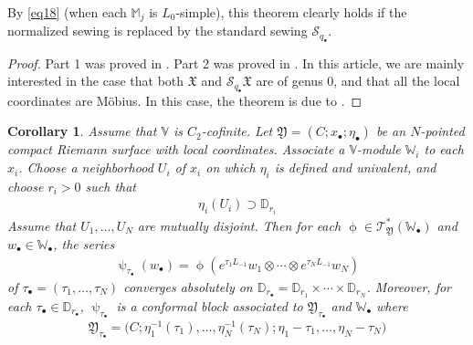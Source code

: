 \documentclass[11pt,b5paper,notitlepage]{article}
\theoremstyle{definition}
\theoremstyle{plain}
\newtheorem{co}[df]{Corollary}
\newcommand{\fk}{\mathfrak}
\newcommand{\mc}{\mathcal}
\newcommand{\scr}{\mathscr}
\newcommand{\blt}{\bullet}
\newcommand{\Vbb}{\mathbb V}
\newcommand{\Wbb}{\mathbb W}
\newcommand{\Mbb}{\mathbb M}
\newcommand{\Dbb}{\mathbb D}
\numberwithin{equation}{section}
\begin{document}
By \eqref{eq18} (when each $\Mbb_j$ is $L_0$-simple), this theorem clearly holds if the normalized sewing is replaced by the standard sewing $\mc S_{q_\blt}$.

\begin{proof}
Part 1 was proved in \cite[Thm. 11.3-1]{Gui23a}. Part 2 was proved in \cite[Thm. 11.4 or 13.1]{Gui23a}. In this article, we are mainly interested in the case that both $\fk X$ and $\mc S_{q_\blt}\fk X$ are of genus 0, and that all the local coordinates are M\"obius. In this case, the theorem is due to \cite{Hua05}.
\end{proof}



\begin{co}\label{lb25}
Assume that $\Vbb$ is $C_2$-cofinite. Let $\fk Y=(C;x_\blt;\eta_\blt)$ be an $N$-pointed compact Riemann surface with local coordinates. Associate a $\Vbb$-module $\Wbb_i$ to each $x_i$. Choose a neighborhood $U_i$ of $x_i$ on which $\eta_i$ is defined and univalent, and choose $r_i>0$ such that
\begin{align*}
\eta_i(U_i)\supset\Dbb_{r_i}
\end{align*}
Assume that $U_1,\dots,U_N$ are mutually disjoint. Then for each $\upphi\in\scr T_{\fk Y}^*(\Wbb_\blt)$ and $w_\blt\in\Wbb_\blt$, the series
\begin{align}
\uppsi_{\tau_\blt}(w_\blt)=\upphi(e^{\tau_1 L_{-1}}w_1\otimes\cdots\otimes e^{\tau_N L_{-1}}w_N) \label{eq63}
\end{align}
of $\tau_\blt=(\tau_1,\dots,\tau_N)$ converges absolutely on $\Dbb_{r_\blt}=\Dbb_{r_1}\times\cdots\times\Dbb_{r_N}$. Moreover, for each $\tau_\blt\in\Dbb_{r_\blt}$, $\uppsi_{\tau_\blt}$ is a conformal block associated to $\fk Y_{\tau_\blt}$ and $\Wbb_\blt$ where
\begin{align*}
\fk Y_{\tau_\blt}=\big(C;\eta_1^{-1}(\tau_1),\dots,\eta_N^{-1}(\tau_N);\eta_1-\tau_1,\dots,\eta_N-\tau_N \big)
\end{align*}
\end{co}
\end{document}
